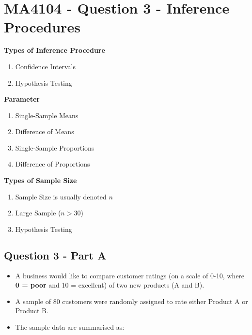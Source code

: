 \documentclass[]{article}
\begin{document}
	
	\Large
	
	\section*{MA4104 - Question 3 - Inference Procedures}
	\begin{framed}
		\noindent \textbf{Types of Inference Procedure}
		\begin{enumerate}
			\item Confidence Intervals
			\item Hypothesis Testing
		\end{enumerate}
	\end{framed}
	\medskip
	\begin{framed}
		\noindent \textbf{Parameter}
		\begin{enumerate}
			\item Single-Sample Means
			\item Difference of Means
			\item Single-Sample Proportions
			\item Difference of Proportions
		\end{enumerate}
	\end{framed}
	\medskip
	\begin{framed}
		\noindent \textbf{Types of Sample Size}
		\begin{enumerate}
			\item Sample Size is usually denoted $n$
			\item Large Sample ($n>30$)
			\item Hypothesis Testing
		\end{enumerate}
	\end{framed}
	
\newpage
\subsection*{Question 3 - Part A}

\begin{itemize}
	\item A business would like to compare customer ratings (on a scale of 0-10, where \textbf{0 = poor} and 10 = excellent) of two new products (A and B). 
	\item A sample of 80 customers were randomly assigned to rate either Product A or Product B. 
	\item The sample data are summarised as:
\end{itemize}
\end{document}
